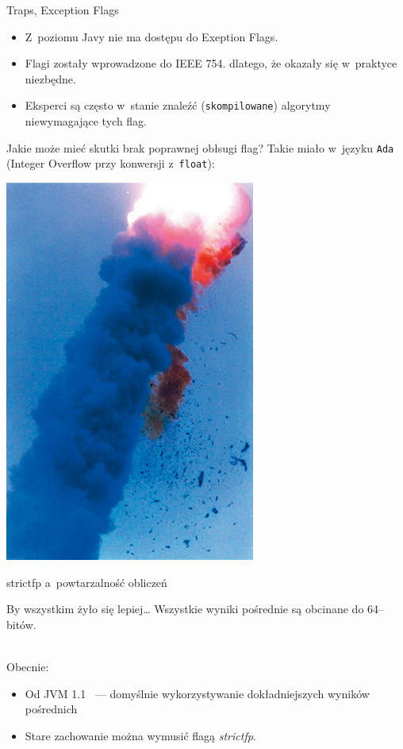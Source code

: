 \documentclass{beamer}
\begin{document}
\begin{frame}{Traps, Exception Flags}
	\begin{itemize}
		\item Z~poziomu Javy nie ma dostępu do Exeption Flags.
		\item Flagi zostały wprowadzone do IEEE 754. dlatego, że okazały się w~praktyce niezbędne.
		\item Eksperci są często w~stanie znaleźć (\texttt{skompilowane}) algorytmy niewymagające tych flag.
	\end{itemize}
	\begin{block}{Jakie może mieć skutki brak poprawnej obłsugi flag?}
		Takie miało w~języku \texttt{Ada} \scriptsize{(Integer Overflow przy konwersji z~\texttt{float})}:\\
		\centerline{\includegraphics[scale=0.18]{ariane.jpg}}
	\end{block}
\end{frame}

\begin{frame}{strictfp a~powtarzalność obliczeń}
	\begin{block}{By wszystkim żyło się lepiej\ldots}
		Wszystkie wyniki pośrednie są obcinane do 64--bitów.
	\end{block} \ \\
	Obecnie:
	\begin{itemize}
		\item Od JVM 1.1 ~--- domyślnie wykorzystywanie dokładniejszych wyników pośrednich
		\item Stare zachowanie można wymusić flagą \emph{strictfp}.
	\end{itemize}
\end{frame}
\end{document}
